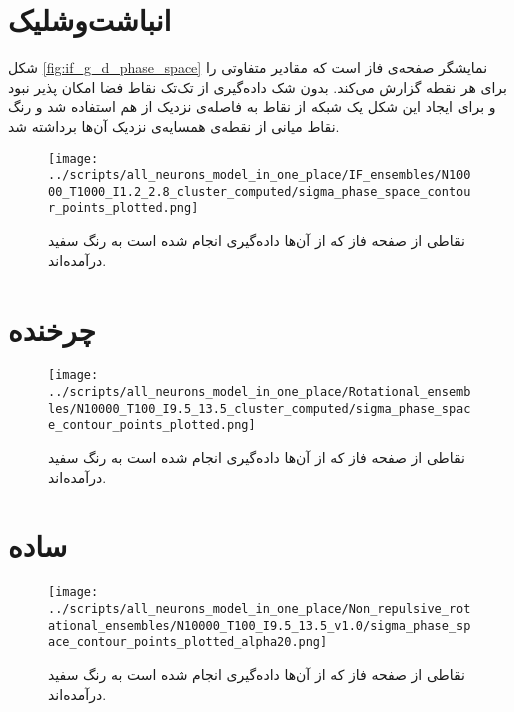 \section{انباشت‌وشلیک} \label{appendix:phase_sampling_if}
شکل \ref{fig:if_g_d_phase_space} نمایشگر صفحه‌ی فاز است که مقادیر متفاوتی را برای هر نقطه گزارش می‌کند. بدون شک داده‌گیری از تک‌تک نقاط فضا امکان پذیر نبود و برای ایجاد این شکل یک شبکه از نقاط به فاصله‌ی نزدیک از هم استفاده شد و رنگ نقاط میانی از نقطه‌ی همسایه‌ی نزدیک آن‌ها برداشته شد.
\begin{figure}
	\texttt{[image: ../scripts/all\_neurons\_model\_in\_one\_place/IF\_ensembles/N10000\_T1000\_I1.2\_2.8\_cluster\_computed/sigma\_phase\_space\_contour\_points\_plotted.png]}
	\caption{نقاطی از صفحه فاز که از آن‌ها داده‌گیری انجام شده است به رنگ سفید درآمده‌اند.}
	\label{fig:if_g_d_phase_if_space_points_plotted}
\end{figure}

\section{چرخنده} \label{appendix:phase_samplingـrotational}
\begin{figure}[h]
	\texttt{[image: ../scripts/all\_neurons\_model\_in\_one\_place/Rotational\_ensembles/N10000\_T100\_I9.5\_13.5\_cluster\_computed/sigma\_phase\_space\_contour\_points\_plotted.png]}
	\caption{
		نقاطی از صفحه فاز که از آن‌ها داده‌گیری انجام شده است به رنگ سفید درآمده‌اند.
	}
	\label{fig:if_g_d_phase_rotational_space_points_plotted}
\end{figure}

\section{ساده} \label{appendix:phase_sampling_simple}
\begin{figure}[h]
	\texttt{[image: ../scripts/all\_neurons\_model\_in\_one\_place/Non\_repulsive\_rotational\_ensembles/N10000\_T100\_I9.5\_13.5\_v1.0/sigma\_phase\_space\_contour\_points\_plotted\_alpha20.png]}
	\caption{نقاطی از صفحه فاز که از آن‌ها داده‌گیری انجام شده است به رنگ سفید درآمده‌اند.}
	\label{fig:if_g_d_phase_space_Non_repulsive_points_plotted}
\end{figure}